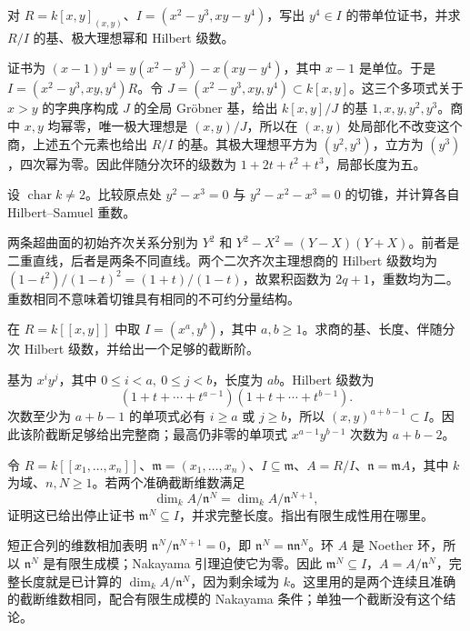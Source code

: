 \begin{exercise}\label{b3:ex:F-two-equations}
	对 \(R=k[x,y]_{(x,y)}\)、\(I=(x^2-y^3,xy-y^4)\)，写出 \(y^4\in I\) 的带单位证书，并求 \(R/I\) 的基、极大理想幂和 Hilbert 级数。
\end{exercise}
\begin{solution}
	证书为 \((x-1)y^4=y(x^2-y^3)-x(xy-y^4)\)，其中 \(x-1\) 是单位。于是 \(I=(x^2-y^3,xy,y^4)R\)。令 \(J=(x^2-y^3,xy,y^4)\subset k[x,y]\)。这三个多项式关于 \(x>y\) 的字典序构成 \(J\) 的全局 Gröbner 基，给出 \(k[x,y]/J\) 的基 \(1,x,y,y^2,y^3\)。商中 \(x,y\) 均幂零，唯一极大理想是 \((x,y)/J\)，所以在 \((x,y)\) 处局部化不改变这个商，上述五个元素也给出 \(R/I\) 的基。其极大理想平方为 \((y^2,y^3)\)，立方为 \((y^3)\)，四次幂为零。因此伴随分次环的级数为 \(1+2t+t^2+t^3\)，局部长度为五。
\end{solution}

\begin{exercise}\label{b3:ex:F-tangent-node}
	设 \(\operatorname{char}k\ne2\)。比较原点处 \(y^2-x^3=0\) 与 \(y^2-x^2-x^3=0\) 的切锥，并计算各自 Hilbert--Samuel 重数。
\end{exercise}
\begin{solution}
	两条超曲面的初始齐次关系分别为 \(Y^2\) 和 \(Y^2-X^2=(Y-X)(Y+X)\)。前者是二重直线，后者是两条不同直线。两个二次齐次主理想商的 Hilbert 级数均为 \((1-t^2)/(1-t)^2=(1+t)/(1-t)\)，故累积函数为 \(2q+1\)，重数均为二。重数相同不意味着切锥具有相同的不可约分量结构。
\end{solution}

\begin{exercise}\label{b3:ex:F-length-rectangle}
	在 \(R=k[\![x,y]\!]\) 中取 \(I=(x^a,y^b)\)，其中 \(a,b\ge1\)。求商的基、长度、伴随分次 Hilbert 级数，并给出一个足够的截断阶。
\end{exercise}
\begin{solution}
	基为 \(x^iy^j\)，其中 \(0\le i<a,\ 0\le j<b\)，长度为 \(ab\)。Hilbert 级数为
	\[
		(1+t+\cdots+t^{a-1})(1+t+\cdots+t^{b-1}).
	\]
	次数至少为 \(a+b-1\) 的单项式必有 \(i\ge a\) 或 \(j\ge b\)，所以 \((x,y)^{a+b-1}\subset I\)。因此该阶截断足够给出完整商；最高仍非零的单项式 \(x^{a-1}y^{b-1}\) 次数为 \(a+b-2\)。
\end{solution}

\begin{exercise}\label{b3:ex:F-truncation-insufficient}
	令 \(R=k[\![x_1,\ldots,x_n]\!]\)、\(\mathfrak m=(x_1,\ldots,x_n)\)、\(I\subseteq\mathfrak m\)、\(A=R/I\)、\(\mathfrak n=\mathfrak mA\)，其中 \(k\) 为域、\(n,N\ge1\)。若两个准确截断维数满足
	\[
		\dim_k A/\mathfrak n^N=\dim_k A/\mathfrak n^{N+1},
	\]
	证明这已给出停止证书 \(\mathfrak m^N\subseteq I\)，并求完整长度。指出有限生成性用在哪里。
\end{exercise}
\begin{solution}
	短正合列的维数相加表明 \(\mathfrak n^N/\mathfrak n^{N+1}=0\)，即 \(\mathfrak n^N=\mathfrak n\mathfrak n^N\)。环 \(A\) 是 Noether 环，所以 \(\mathfrak n^N\) 是有限生成模；Nakayama 引理迫使它为零。因此 \(\mathfrak m^N\subseteq I\)，\(A=A/\mathfrak n^N\)，完整长度就是已计算的 \(\dim_k A/\mathfrak n^N\)，因为剩余域为 \(k\)。这里用的是两个连续且准确的截断维数相同，配合有限生成模的 Nakayama 条件；单独一个截断没有这个结论。
\end{solution}

